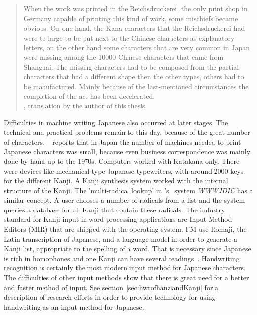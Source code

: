\begin{quote}
When the work was printed in the Reichsdruckerei, the only print shop
in Germany capable of printing this kind of work, some mischiefs became obvious.
On one hand, the Kana characters that the Reichsdruckerei had were to large to
be put next to the Chinese characters as explanatory letters, on the other
hand some characters that are very common in Japan were missing among 
the 10000 Chinese characters that came from Shanghai.
The missing characters had to be composed from the partial characters that
had a different shape then the other types, others had to be manufactured.
Mainly because of the last-mentioned circumstances the completion of the
act has been decelerated.\\
, translation by the author of this thesis.
\end{quote}

Difficulties in machine writing Japanese also occurred at later stages. The 
technical and practical problems remain to this day, because of the great number
of characters. ~\citeyear{Foljanty1984} reports that 
in Japan the number of 
machines needed to print Japanese characters was small, because even business
correspondence was mainly done by hand up to the 1970s. Computers worked with
Katakana only. There were devices like mechanical-type Japanese typewriters,
with around 2000 keys for the different Kanji. A Kanji synthesis system worked
with the internal structure of the Kanji. The 'multi-radical lookup' in 
's~\citeyear{Breen2004} system \emph{WWWJDIC} has
a similar concept. A user chooses a number of radicals from a list and the 
system queries a database for all Kanji that contain these radicals.
The industry standard for Kanji input in word processing applications are 
Input Method Editors (MIR) that are shipped with the operating system. 
I'M use Romaji, the Latin transcription of Japanese, and 
a language model in order to generate a Kanji list, 
appropriate to the spelling of a word. 
That is necessary since Japanese is rich in homophones and one Kanji can 
have several readings~. 
Handwriting recognition is certainly the most modern input method for Japanese 
characters. The difficulties of other input methods show that there is 
great need for a better and faster method of input. See 
section~\ref{sec:hwrofhanziandKanji} for a description of research 
efforts in order to provide technology for using handwriting as an input method 
for Japanese.


